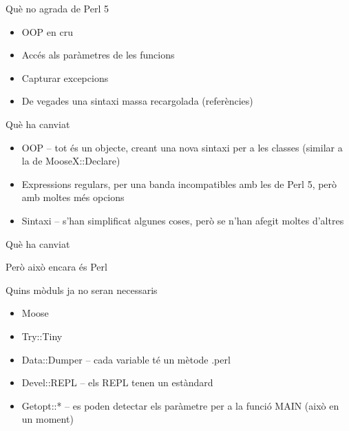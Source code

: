 \documentclass{beamer}
\begin{document}
\begin{frame}{Què no agrada de Perl 5}
	\begin{itemize}
		\item OOP en cru
		\item Accés als paràmetres de les funcions
		\item Capturar excepcions
		\item De vegades una sintaxi massa recargolada (referències) %
	\end{itemize}
\end{frame}

\begin{frame}{Què ha canviat}
	\begin{itemize}
		\item OOP -- tot és un objecte, creant una nova sintaxi
			per a les classes (similar a la de MooseX::Declare)
		\item Expressions regulars, per una banda incompatibles
            amb les de Perl 5, però amb moltes més opcions
		\item Sintaxi -- s'han simplificat algunes coses,
			però se n'han afegit moltes d'altres
	\end{itemize}
\end{frame}

\begin{frame}[fragile]{Què ha canviat}
	\begin{center}
		{\Huge Però això encara és Perl}
	\end{center}
\end{frame}

\begin{frame}[fragile]{Quins mòduls ja no seran necessaris}
	\begin{itemize}
		\item Moose
		\item Try::Tiny
		\item Data::Dumper -- cada variable té un mètode .perl
		\item Devel::REPL -- els REPL tenen un estàndard
		\item Getopt::* -- es poden detectar els paràmetre per a
            la funció MAIN (això en un moment) %
	\end{itemize}
\end{frame}
\end{document}

